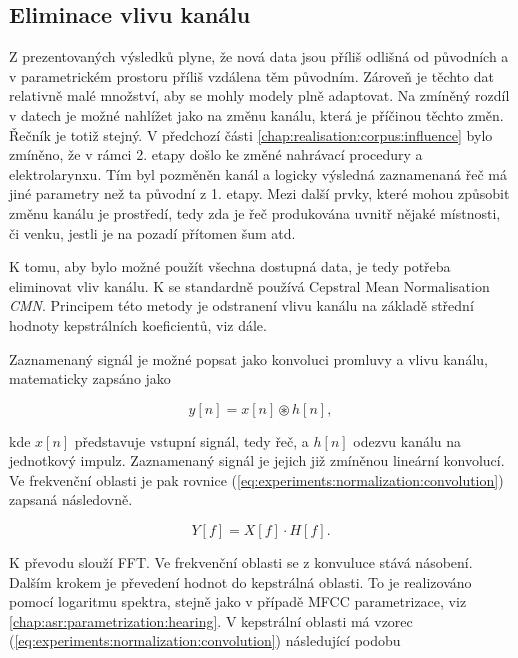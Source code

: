 
\subsection{Eliminace vlivu kanálu}
\label{chap:realisation:corpus:elimination}

Z prezentovaných výsledků plyne, že nová data jsou příliš odlišná od původních a v parametrickém prostoru příliš vzdálena těm původním. Zároveň je těchto dat relativně malé množství, aby se mohly modely plně adaptovat. Na zmíněný rozdíl v datech je možné nahlížet jako na změnu kanálu, která je příčinou těchto změn. Řečník je totiž stejný. V předchozí části \ref{chap:realisation:corpus:influence} bylo zmíněno, že v rámci 2. etapy došlo ke změné nahrávací procedury a elektrolarynxu. Tím byl pozměněn kanál a logicky výsledná zaznamenaná řeč má jiné parametry než ta původní z 1. etapy. Mezi další prvky, které mohou způsobit změnu kanálu je prostředí, tedy zda je řeč produkována uvnitř nějaké místnosti, či venku, jestli je na pozadí přítomen šum atd.

K tomu, aby bylo možné použít všechna dostupná data, je tedy potřeba eliminovat vliv kanálu. K se standardně používá Cepstral Mean Normalisation \textit{CMN}. Principem této metody je odstranení vlivu kanálu na základě střední hodnoty kepstrálních koeficientů, viz dále.

Zaznamenaný signál je možné popsat jako konvoluci promluvy a vlivu kanálu, matematicky zapsáno jako

\begin{equation}
  y\left[n\right] = x\left[n\right] \circledast h\left[n\right],
  \label{eq:experiments:normalization:convolution}
\end{equation}

\noindent kde $x\left[n\right]$ představuje vstupní signál, tedy řeč, a $h\left[n\right]$ odezvu kanálu na jednotkový impulz. Zaznamenaný signál je jejich již zmíněnou lineární konvolucí. Ve frekvenční oblasti je pak rovnice (\ref{eq:experiments:normalization:convolution}) zapsaná následovně.

\begin{equation}
  Y\left[f\right] = X\left[f\right] \cdot H\left[f\right].
\end{equation}

\noindent K převodu slouží FFT. Ve frekvenční oblasti se z konvuluce stává násobení. Dalším krokem je převedení hodnot do kepstrálná oblasti. To je realizováno pomocí logaritmu spektra, stejně jako v případě MFCC parametrizace, viz \ref{chap:asr:parametrization:hearing}. V kepstrální oblasti má vzorec (\ref{eq:experiments:normalization:convolution}) následující podobu

